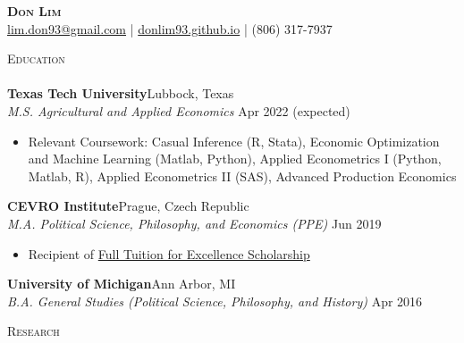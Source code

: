 \documentclass[a4paper]{article}
\newcommand{\lineunder} {
    \vspace*{-8pt} \\
    \hspace*{-18pt} \hrulefill \\
}
\newcommand{\header} [1] {
    {\hspace*{-18pt}\vspace*{6pt} \textsc{\large{#1}}}
    \vspace*{-6pt} \lineunder
}
\begin{document}
\vspace*{-40pt}

    

\vspace*{-10pt}
\begin{center}
	{\Huge \scshape \textbf{{Don Lim}}}\\
	\href{mailto:lim.don93@gmail.com}{lim.don93@gmail.com} | \href{https://donlim93.github.io/}{donlim93.github.io} | (806) 317-7937\\
\end{center}

\header{Education}
\vspace{1mm}
\textbf{Texas Tech University}\hfill Lubbock, Texas\\
\textit{M.S. Agricultural and Applied Economics} \hfill Apr 2022 (expected)\\
\begin{itemize}[noitemsep,nolistsep]
	\item Relevant Coursework: Casual Inference (R, Stata), Economic Optimization and Machine Learning (Matlab, Python), Applied Econometrics I (Python, Matlab, R), Applied Econometrics II (SAS), Advanced Production Economics
\end{itemize}
\vspace{1mm}
\textbf{CEVRO Institute}\hfill Prague, Czech Republic\\
\textit{M.A. Political Science, Philosophy, and Economics (PPE)} \hfill Jun 2019\\
\begin{itemize}[noitemsep,nolistsep]
	\item Recipient of \href{http://www.cevroinstitut.cz/en/article/scholarships/}{Full Tuition for Excellence Scholarship}
\end{itemize}
\vspace{1mm}
\textbf{University of Michigan}\hfill Ann Arbor, MI\\
\textit{B.A. General Studies (Political Science, Philosophy, and History)} \hfill Apr 2016\\
\vspace{2mm}

\header{Research}
\vspace{1mm}
\end{document}
